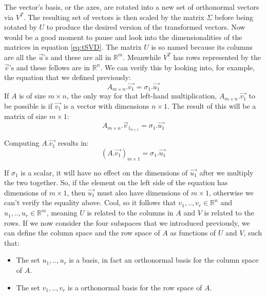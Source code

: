 \documentclass[a4,12pt,twosided,openany]{memoir}
\begin{document}
\indent
The vector’s basis, or the axes, are rotated into a new set of orthonormal vectors via $V^T$. The resulting set of vectors is then scaled by the matrix $\Sigma$ before being rotated by $U$ to produce the desired version of the transformed vectors. Now would be a good moment to pause and look into the dimensionalities of the matrices in equation \ref{eq:tSVD}. The matrix $U$ is so named because its columns are all the $\overrightarrow{u}$’s and these are all in $\mathbb{R}^m$. Meanwhile $V^T$ has rows represented by the $\overrightarrow{v}$’s and these fellows are in $\mathbb{R}^n$. We can verify this by looking into, for example, the equation that we defined previously:
\[A_{m \times n}.\overrightarrow{v_1} = \sigma_1.\overrightarrow{u_1}\]
If $A$ is of size $m \times n$, the only way for that left-hand multiplication,  $A_{m \times n}.\overrightarrow{v_1}$ to be possible is if $\overrightarrow{v_1}$ is a vector with dimensions $n \times 1$. The result of this will be a matrix of size $m \times 1$:
\[ A_{m \times n}.\overrightarrow{v}_{1_{n \times 1}} = \sigma_1.\overrightarrow{u_1} \]
\par 
\indent
Computing $A.\overrightarrow{v_1}$ results in:
\[\left(A.\overrightarrow{v_1} \right)_{m \times 1} = \sigma_1.\overrightarrow{u_1} \]
\par 
\indent
If $\sigma_1$ is a scalar, it will have no effect on the dimensions of $\overrightarrow{u_1}$ after we multiply the two together. So, if the element on the left side of the equation has dimensions of $m \times 1$, then $\overrightarrow{u_1}$ must also have dimensions of $m \times 1$, otherwise we can’t verify the equality above. Cool, so it follows that $v_1,..,v_r \in \mathbb{R}^n$ and $u_1,..,u_r \in \mathbb{R}^m$, meaning $U$ is related to the columns in $A$ and $V$ is related to the rows. If we now consider the four subspaces that we introduced previously, we can define the column space and the row space of $A$ as functions of $U$ and $V$, such that: 
\begin{tcolorbox}
\begin{itemize}
\item The set $u_1,..,u_r$ is a basis, in fact an orthonormal basis for the column space of $A$.
\item The set $v_1,..,v_r$ is a orthonormal basis for the row space of $A$.
\end{itemize}
\end{tcolorbox}
\par 
\indent
\end{document}
